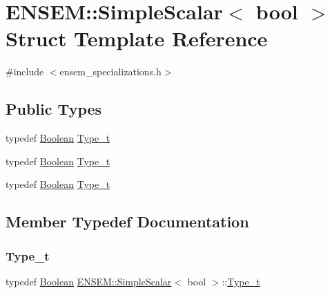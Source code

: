 \hypertarget{structENSEM_1_1SimpleScalar_3_01bool_01_4}{}\section{E\+N\+S\+EM\+:\+:Simple\+Scalar$<$ bool $>$ Struct Template Reference}
\label{structENSEM_1_1SimpleScalar_3_01bool_01_4}


{\ttfamily \#include $<$ensem\+\_\+specializations.\+h$>$}

\subsection*{Public Types}
\begin{DoxyCompactItemize}
\item 
typedef \mbox{\hyperlink{group__defs_ga38f0cd64d26e121e75367986f2d7cd6c}{Boolean}} \mbox{\hyperlink{structENSEM_1_1SimpleScalar_3_01bool_01_4_a1857cdcebad8e9a51ea6bf7234faf05d}{Type\+\_\+t}}
\item 
typedef \mbox{\hyperlink{group__defs_ga38f0cd64d26e121e75367986f2d7cd6c}{Boolean}} \mbox{\hyperlink{structENSEM_1_1SimpleScalar_3_01bool_01_4_a1857cdcebad8e9a51ea6bf7234faf05d}{Type\+\_\+t}}
\item 
typedef \mbox{\hyperlink{group__defs_ga38f0cd64d26e121e75367986f2d7cd6c}{Boolean}} \mbox{\hyperlink{structENSEM_1_1SimpleScalar_3_01bool_01_4_a1857cdcebad8e9a51ea6bf7234faf05d}{Type\+\_\+t}}
\end{DoxyCompactItemize}


\subsection{Member Typedef Documentation}
\mbox{\label{structENSEM_1_1SimpleScalar_3_01bool_01_4_a1857cdcebad8e9a51ea6bf7234faf05d}} 
\subsubsection{\texorpdfstring{Type\_t}{Type\_t}\hspace{0.1cm}{\footnotesize\ttfamily [1/3]}}
{\footnotesize\ttfamily typedef \mbox{\hyperlink{group__defs_ga38f0cd64d26e121e75367986f2d7cd6c}{Boolean}} \mbox{\hyperlink{structENSEM_1_1SimpleScalar}{E\+N\+S\+E\+M\+::\+Simple\+Scalar}}$<$ bool $>$\+::\mbox{\hyperlink{structENSEM_1_1SimpleScalar_3_01bool_01_4_a1857cdcebad8e9a51ea6bf7234faf05d}{Type\+\_\+t}}}

